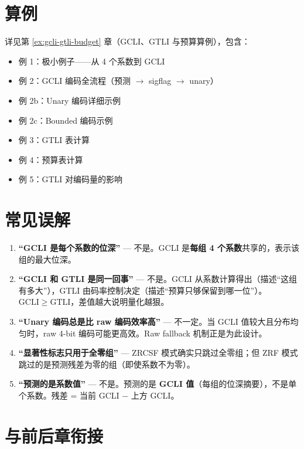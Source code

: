 \section{算例}

详见第 \ref{ex:gcli-gtli-budget} 章（GCLI、GTLI 与预算算例），包含：
\begin{itemize}
  \item 例 1：极小例子——从 4 个系数到 GCLI
  \item 例 2：GCLI 编码全流程（预测 $\to$ sigflag $\to$ unary）
  \item 例 2b：Unary 编码详细示例
  \item 例 2c：Bounded 编码示例
  \item 例 3：GTLI 表计算
  \item 例 4：预算表计算
  \item 例 5：GTLI 对编码量的影响
\end{itemize}

\section{常见误解}

\begin{misunderstanding}
\begin{enumerate}
  \item \textbf{``GCLI 是每个系数的位深''} --- 不是。GCLI 是\textbf{每组 4 个系数}共享的，表示该组的最大位深。
  \item \textbf{``GCLI 和 GTLI 是同一回事''} --- 不是。GCLI 从系数计算得出（描述``这组有多大''），GTLI 由码率控制决定（描述``预算只够保留到哪一位''）。$\mathrm{GCLI} \geq \mathrm{GTLI}$，差值越大说明量化越狠。
  \item \textbf{``Unary 编码总是比 raw 编码效率高''} --- 不一定。当 GCLI 值较大且分布均匀时，raw 4-bit 编码可能更高效。Raw fallback 机制正是为此设计。
  \item \textbf{``显著性标志只用于全零组''} --- ZRCSF 模式确实只跳过全零组；但 ZRF 模式跳过的是预测残差为零的组（即使系数不为零）。
  \item \textbf{``预测的是系数值''} --- 不是。预测的是 \textbf{GCLI 值}（每组的位深摘要），不是单个系数。残差 = 当前 GCLI $-$ 上方 GCLI。
\end{enumerate}
\end{misunderstanding}

\section{与前后章衔接}

